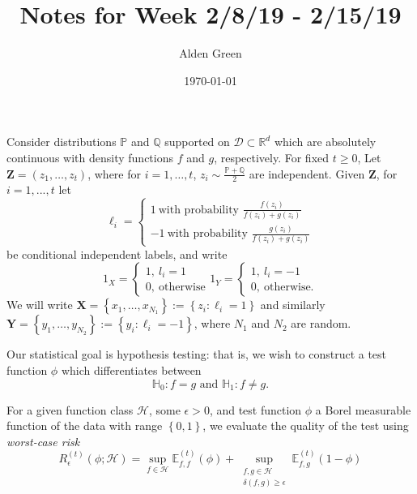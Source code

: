 \documentclass{article}
\newcommand{\Reals}{\mathbb{R}}
\newcommand{\set}[1]{\left\{#1\right\}}
\newcommand{\1}{\mathbb{I}}
\newcommand{\D}{\mathcal{D}}
\newcommand{\Xbf}{\mathbf{X}}
\newcommand{\Ybf}{\mathbf{Y}}
\newcommand{\Zbf}{\mathbf{Z}}
\newcommand{\Hclass}{\mathcal{H}}
\newcommand{\Pbb}{\mathbb{P}}
\newcommand{\Ebb}{\mathbb{E}}
\newcommand{\Qbb}{\mathbb{Q}}
\theoremstyle{alden}
\theoremstyle{aldenthm}
\theoremstyle{definition}
\theoremstyle{remark}
\begin{document}
\title{Notes for Week 2/8/19 - 2/15/19}
\author{Alden Green}
\date{\today}
\maketitle

Consider distributions $\Pbb$ and $\Qbb$ supported on $\D \subset \Reals^d$ which are absolutely continuous with density functions $f$ and $g$, respectively. For fixed $t \geq 0$, Let $\Zbf = (z_1, \ldots,z_t)$, where for $i = 1,\ldots,t$, $z_i \sim \frac{\Pbb + \Qbb}{2}$ are independent. Given $\Zbf$, for $i = 1,...,t$ let
\begin{equation*}
\ell_i = 
\begin{cases}
1~ \text{with probability $\frac{f(z_i)}{f(z_i) + g(z_i)}$} \\
-1~ \text{with probability $\frac{g(z_i)}{f(z_i) + g(z_i)}$}
\end{cases}
\end{equation*} 
be conditional independent labels, and write
\begin{equation*}
1_X = 
\begin{cases}
1,~ l_i = 1\\
0,~ \text{otherwise}
\end{cases}
1_Y = 
\begin{cases}
1,~ l_i = -1 \\
0,~ \text{otherwise.}
\end{cases}
\end{equation*}
We will write $\Xbf = \set{x_1, \ldots,x_{N_1}} := \set{z_i: \ell_i = 1}$ and similarly $\Ybf = \set{y_1, \ldots,y_{N_2}} := \set{y_i: \ell_i = -1}$, where $N_1$ and $N_2$ are random.

Our statistical goal is hypothesis testing: that is, we wish to construct a test function $\phi$ which differentiates between
\begin{equation*}
\mathbb{H}_0: f = g \text{ and } \mathbb{H}_1: f \neq g.
\end{equation*}

For a given function class $\Hclass$, some $\epsilon > 0$, and test function $\phi$ a Borel measurable function of the data with range $\set{0,1}$, we evaluate the quality of the test using \emph{worst-case risk}
\begin{equation*}
R_{\epsilon}^{(t)}(\phi; \Hclass) = \sup_{f \in \Hclass} \Ebb_{f,f}^{(t)}(\phi) + \sup_{ \substack{f,g \in \Hclass \\ \delta(f,g) \geq \epsilon } } \Ebb_{f,g}^{(t)}(1 - \phi)
\end{equation*} 
\end{document}
